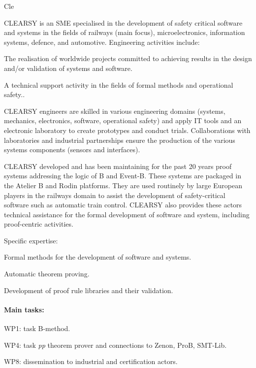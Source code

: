 \begin{sitedescription}{Cle}


CLEARSY is an SME specialised in the development of safety critical software and systems in the fields
of railways (main focus), microelectronics, information systems, defence, and automotive. Engineering 
activities include:
\begin{compactitem}
\item The realisation of worldwide projects committed to achieving results in the design and/or validation of systems and software.
\item A technical support activity in the fields of formal methods and operational safety..
\end{compactitem}

CLEARSY engineers are skilled in various engineering domains (systems, mechanics, electronics, software,
operational safety) and apply IT tools and an electronic laboratory to create prototypes and
conduct trials. Collaborations with laboratories and industrial partnerships ensure the production of
the various systems components (sensors and interfaces).

CLEARSY developed and has been maintaining for the past 20 years proof systems
addressing the logic of B and Event-B. These systems are 
packaged in the Atelier B and Rodin platforms. They are used routinely by large European players in the railways domain to assist the
development of safety-critical software such as automatic train control. CLEARSY also provides these actors technical assistance for the formal development of software and system, including proof-centric activities. 

Specific expertise:
\begin{compactitem}
\item Formal methods for the development of software and systems.
\item Automatic theorem proving.
\item Development of proof rule libraries and their validation.
\end{compactitem}

\paragraph*{Main tasks:}

\begin{compactitem}
\item WP1: task B-method.
\item WP4: task \emph{pp} theorem prover and connections to Zenon, ProB, SMT-Lib.
\item WP8: dissemination to industrial and certification actors.
\end{compactitem}



\end{sitedescription}
